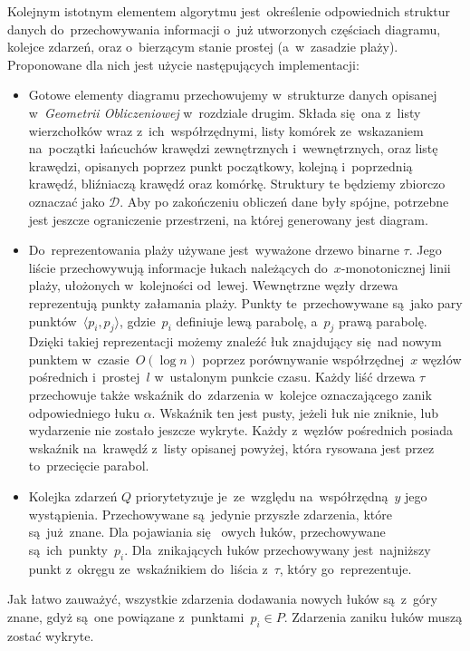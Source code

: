 \documentclass[skorowidz,autorrok,backref,xodstep,oswiadczenie]{wmimgr}
\begin{document}
Kolejnym istotnym elementem algorytmu jest~określenie odpowiednich struktur danych do~przechowywania informacji o~już utworzonych częściach diagramu, kolejce zdarzeń, oraz o~bierzącym stanie prostej (a~w~zasadzie plaży). Proponowane dla nich jest użycie następujących implementacji:
\begin{itemize}
\item
Gotowe elementy diagramu przechowujemy w~strukturze danych opisanej w~\emph{Geometrii Obliczeniowej} w~rozdziale drugim\cite{geometria}. Składa się~ona z~listy wierzchołków wraz z~ich~współrzędnymi, listy komórek ze~wskazaniem na~początki łańcuchów krawędzi zewnętrznych i~wewnętrznych, oraz listę krawędzi, opisanych poprzez punkt początkowy, kolejną i~poprzednią krawędź, bliźniaczą krawędź oraz komórkę. Struktury te będziemy zbiorczo oznaczać jako $\mathcal{D}$. Aby po zakończeniu obliczeń dane były spójne, potrzebne jest jeszcze ograniczenie przestrzeni, na której generowany jest diagram.
\item
Do~reprezentowania plaży używane jest~wyważone drzewo binarne $\tau$. Jego liście przechowywują informacje łukach należących do~$x$-monotonicznej linii plaży, ułożonych w~kolejności od~lewej. Wewnętrzne węzły drzewa reprezentują punkty załamania plaży. Punkty te~przechowywane są~jako pary punktów~$\langle p_{i}, p_{j}\rangle$, gdzie~$p_{i}$ definiuje lewą parabolę, a~$p_{j}$ prawą parabolę. Dzięki takiej reprezentacji możemy znaleźć łuk znajdujący się~nad nowym punktem w~czasie~$O(\log{n})$ poprzez porównywanie współrzędnej~$x$ węzłów pośrednich i~prostej~$l$ w~ustalonym punkcie czasu.
Każdy liść drzewa $\tau$ przechowuje także wskaźnik do~zdarzenia w~kolejce oznaczającego zanik odpowiedniego łuku $\alpha$. Wskaźnik ten jest pusty, jeżeli łuk nie zniknie, lub wydarzenie nie zostało jeszcze wykryte. Każdy z~węzłów pośrednich posiada wskaźnik na~krawędź z~listy opisanej powyżej, która rysowana jest przez to~przecięcie parabol.
\item
Kolejka zdarzeń $Q$ priorytetyzuje je~ze~względu na~współrzędną~$y$ jego wystąpienia. Przechowywane są~jedynie przyszłe zdarzenia, które są~już~znane. Dla pojawiania się ~owych łuków, przechowywane są~ich~punkty~$p_{i}$. Dla~znikających łuków przechowywany jest~najniższy punkt z~okręgu ze~wskaźnikiem do~liścia z~$\tau$, który go~reprezentuje.
\end{itemize}

Jak łatwo zauważyć, wszystkie zdarzenia dodawania nowych łuków są~z~góry znane, gdyż są~one powiązane z~punktami~$p_{i} \in P$. Zdarzenia zaniku łuków muszą zostać wykryte.
\end{document}
